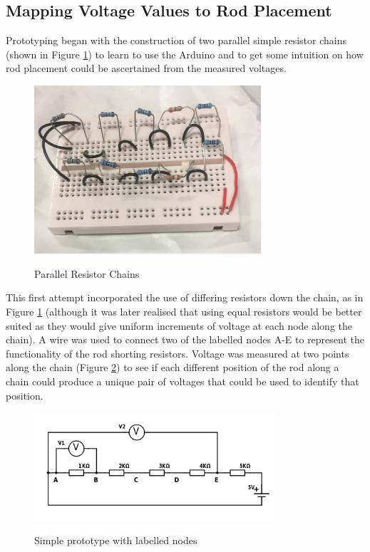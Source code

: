 \subsection{Mapping Voltage Values to Rod Placement}
\label{sec:voltages}
Prototyping began with the construction of two parallel simple resistor chains (shown in Figure \ref{fig:simple_resistor}) to learn to use the Arduino and to get some intuition on how rod placement could be ascertained from the measured voltages. 

\begin{figure}[H]
	\begin{center}
	\includegraphics[width=0.75\textwidth]{simple_resistor_chain.jpg}\\
  	\caption{Parallel Resistor Chains}
    \label{fig:simple_resistor}
    \end{center}
\end{figure}

This first attempt incorporated the use of differing resistors down the chain, as in Figure \ref{fig:simple_resistor} (although it was later realised that using equal resistors would be better suited as they would give uniform increments of voltage at each node along the chain). A wire was used to connect two of the labelled nodes A-E to represent the functionality of the rod shorting resistors. Voltage was measured at two points along the chain (Figure \ref{fig:5r}) to see if each different position of the rod along a chain could produce a unique pair of voltages that could be used to identify that position.  \\



\begin{figure}[H]
	\begin{center}
	\includegraphics[width=0.8\textwidth]{5r.png}\\ 
  	\caption{Simple prototype with labelled nodes}
    \label{fig:5r}
    \end{center}
\end{figure}



